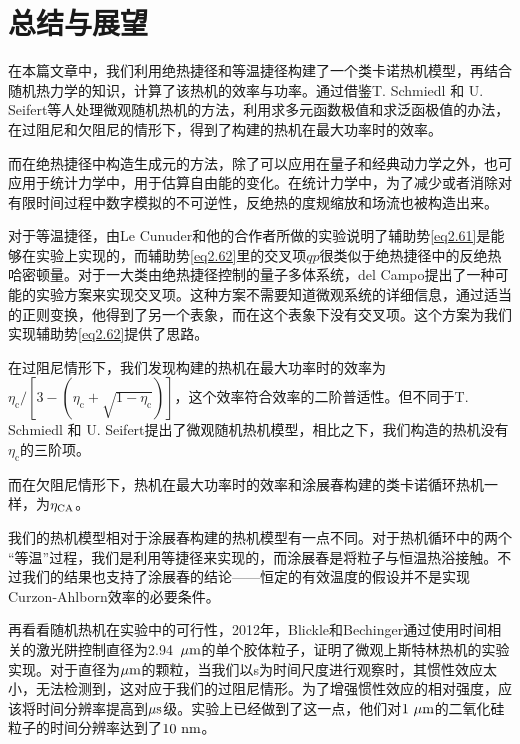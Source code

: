 \chapter{总结与展望}
在本篇文章中，我们利用绝热捷径和等温捷径构建了一个类卡诺热机模型，再结合随机热力学的知识，计算了该热机的效率与功率。通过借鉴T. Schmiedl 和 U. Seifert\cite{Schmiedl2008}等人处理微观随机热机的方法，利用求多元函数极值和求泛函极值的办法，在过阻尼和欠阻尼的情形下，得到了构建的热机在最大功率时的效率。

而在绝热捷径中构造生成元的方法，除了可以应用在量子和经典动力学之外，也可应用于统计力学中，用于估算自由能的变化。在统计力学中，为了减少或者消除对有限时间过程中数字模拟的不可逆性，反绝热的度规缩放\cite{Miller2000}和场流\cite{Vaikuntanathan2008}也被构造出来。

对于等温捷径，由Le Cunuder和他的合作者所做的实验\cite{LeCunuder2016}说明了辅助势\eqref{eq2.61}是能够在实验上实现的，而辅助势\eqref{eq2.62}里的交叉项$qp$很类似于绝热捷径中的反绝热哈密顿量\cite{Jarzynski2013,Deffner2014,DelCampo2013}。对于一大类由绝热捷径控制的量子多体系统，del Campo提出了一种可能的实验方案\cite{DelCampo2013}来实现交叉项。这种方案不需要知道微观系统的详细信息，通过适当的正则变换，他得到了另一个表象，而在这个表象下没有交叉项。这个方案为我们实现辅助势\eqref{eq2.62}提供了思路。

在过阻尼情形下，我们发现构建的热机在最大功率时的效率为${\eta_{\mathrm{c}}}/\left[3-\left(\eta_{\mathrm{c}}+\sqrt{1-\eta_{\mathrm{c}}}\right)\right]$，这个效率符合效率的二阶普适性。但不同于T. Schmiedl 和 U. Seifert提出了微观随机热机模型\cite{Schmiedl2008}，相比之下，我们构造的热机没有$\eta_{\mathrm{c}}$的三阶项。

而在欠阻尼情形下，热机在最大功率时的效率和涂展春构建的类卡诺循环热机\cite{Tu2013}一样，为$\eta_{\mathrm{CA}}$。


我们的热机模型相对于涂展春构建的热机模型\cite{Tu2013}有一点不同。对于热机循环中的两个 “等温”过程，我们是利用等捷径来实现的，而涂展春是将粒子与恒温热浴接触。不过我们的结果也支持了涂展春的结论\cite{Tu2013}——恒定的有效温度的假设并不是实现Curzon-Ahlborn效率的必要条件。


再看看随机热机在实验中的可行性\cite{Tu2013}，2012年，Blickle和Bechinger\cite{Blickle2012}通过使用时间相关的激光阱控制直径为2.94~$\mathrm{\mu m}$的单个胶体粒子，证明了微观上斯特林热机的实验实现。对于直径为$\mathrm{\mu m}$的颗粒，当我们以s为时间尺度进行观察时，其惯性效应太小，无法检测到，这对应于我们的过阻尼情形。为了增强惯性效应的相对强度，应该将时间分辨率提高到$\mathrm{\mu s}$级。实验上\cite{Li2013,Huang2011}已经做到了这一点，他们对$1 ~ \mathrm{\mu m}$的二氧化硅粒子的时间分辨率达到了$10 ~ \mathrm{n m}$。